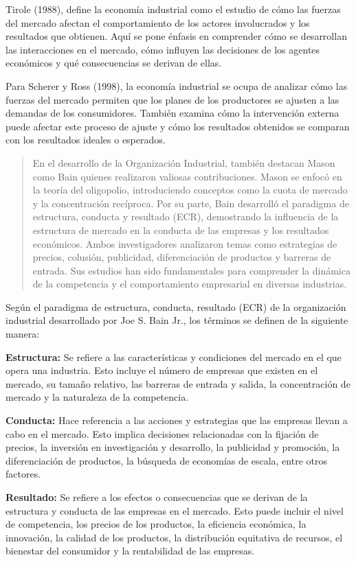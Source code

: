 \documentclass[
  letterpaper,
  DIV=11,
  numbers=noendperiod]{scrartcl}
\begin{document}
Tirole (1988), define la economía industrial como el estudio de cómo las
fuerzas del mercado afectan el comportamiento de los actores
involucrados y los resultados que obtienen. Aquí se pone énfasis en
comprender cómo se desarrollan las interacciones en el mercado, cómo
influyen las decisiones de los agentes económicos y qué consecuencias se
derivan de ellas.

Para Scherer y Ross (1998), la economía industrial se ocupa de analizar
cómo las fuerzas del mercado permiten que los planes de los productores
se ajusten a las demandas de los consumidores. También examina cómo la
intervención externa puede afectar este proceso de ajuste y cómo los
resultados obtenidos se comparan con los resultados ideales o esperados.

\begin{quote}
En el desarrollo de la Organización Industrial, también destacan Mason
como Bain quienes realizaron valiosas contribuciones. Mason se enfocó en
la teoría del oligopolio, introduciendo conceptos como la cuota de
mercado y la concentración recíproca. Por su parte, Bain desarrolló el
paradigma de estructura, conducta y resultado (ECR), demostrando la
influencia de la estructura de mercado en la conducta de las empresas y
los resultados económicos. Ambos investigadores analizaron temas como
estrategias de precios, colusión, publicidad, diferenciación de
productos y barreras de entrada. Sus estudios han sido fundamentales
para comprender la dinámica de la competencia y el comportamiento
empresarial en diversas industrias.
\end{quote}

Según el paradigma de estructura, conducta, resultado (ECR) de la
organización industrial desarrollado por Joe S. Bain Jr., los términos
se definen de la siguiente manera:

\textbf{Estructura:} Se refiere a las características y condiciones del
mercado en el que opera una industria. Esto incluye el número de
empresas que existen en el mercado, su tamaño relativo, las barreras de
entrada y salida, la concentración de mercado y la naturaleza de la
competencia.

\textbf{Conducta:} Hace referencia a las acciones y estrategias que las
empresas llevan a cabo en el mercado. Esto implica decisiones
relacionadas con la fijación de precios, la inversión en investigación y
desarrollo, la publicidad y promoción, la diferenciación de productos,
la búsqueda de economías de escala, entre otros factores.

\textbf{Resultado:} Se refiere a los efectos o consecuencias que se
derivan de la estructura y conducta de las empresas en el mercado. Esto
puede incluir el nivel de competencia, los precios de los productos, la
eficiencia económica, la innovación, la calidad de los productos, la
distribución equitativa de recursos, el bienestar del consumidor y la
rentabilidad de las empresas.
\end{document}
